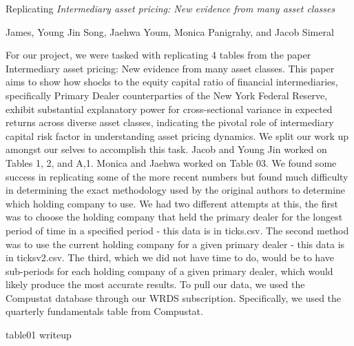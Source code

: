 \documentclass{article}
\begin{document}
{
\fontsize{12}{14}\selectfont
\textnormal{Replicating} \textit{Intermediary asset pricing: New evidence from many asset classes}
}

\bigskip

{
\fontsize{10}{12}\selectfont
James, Young Jin Song, Jaehwa Youm, Monica Panigrahy, and Jacob Simeral
}
\par

For our project, we were tasked with replicating 4 tables from the paper Intermediary asset pricing: New evidence from many asset classes. This paper aims to show how shocks to the equity capital ratio of financial intermediaries, specifically Primary Dealer counterparties of the New York Federal Reserve, exhibit substantial explanatory power for cross-sectional variance in expected returns across diverse asset classes, indicating the pivotal role of intermediary capital risk factor in understanding asset pricing dynamics. We split our work up amongst our selves to accomplish this task. Jacob and Young Jin worked on Tables 1, 2, and A,1. Monica and Jaehwa worked on Table 03.
We found some success in replicating some of the more recent numbers but found much difficulty in determining the exact methodology used by the original authors to determine which holding company to use. We had two different attempts at this, the first was to choose the holding company that held the primary dealer for the longest period of time in a specified period - this data is in ticks.csv. The second method was to use the current holding company for a given primary dealer - this data is in ticksv2.csv. The third, which we did not have time to do, would be to have sub-periods for each holding company of a given primary dealer, which would likely produce the most accurate results.
To pull our data, we used the Compustat database through our WRDS subscription. Specifically, we used the quarterly fundamentals table from Compustat.
\par

\par
table01 writeup\par
\end{document}
